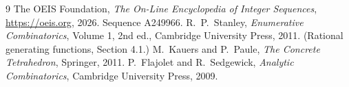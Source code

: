 \documentclass[11pt,a4paper]{article}
\theoremstyle{plain}
\theoremstyle{definition}
\begin{document}
\begin{thebibliography}{9}
 The OEIS Foundation, \emph{The On-Line Encyclopedia of Integer
Sequences}, \url{https://oeis.org}, 2026. Sequence A249966.
 R.~P.~Stanley, \emph{Enumerative Combinatorics}, Volume 1, 2nd ed.,
Cambridge University Press, 2011. (Rational generating functions, Section 4.1.)
 M.~Kauers and P.~Paule, \emph{The Concrete Tetrahedron}, Springer, 2011.
 P.~Flajolet and R.~Sedgewick, \emph{Analytic Combinatorics}, Cambridge
University Press, 2009.
\end{thebibliography}
\end{document}
